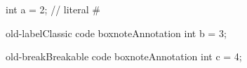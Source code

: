 \documentclass{article}
\begin{document}
\begin{miniCode}
int a = 2; // literal # %
\end{miniCode}
\begin{CodeBox}{old-label}{Classic code box}{note}{Annotation}
int b = 3;
\end{CodeBox}
\begin{CodeBox*}{old-break}{Breakable code box}{note}{Annotation}
int c = 4;
\end{CodeBox*}
\end{document}

